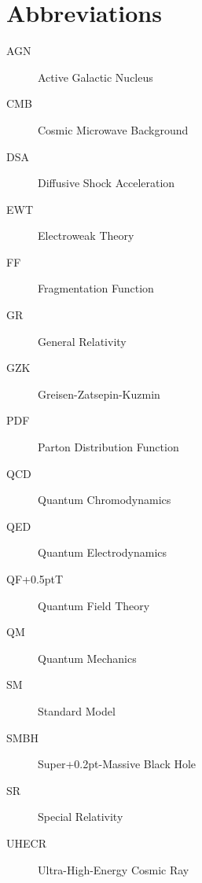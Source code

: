 \chapter*{Abbreviations}
\label{ch:abbreviations}

\begin{description}
	\item[AGN] Active Galactic Nucleus
	\item[CMB] Cosmic Microwave Background
	\item[DSA] Diffusive Shock Acceleration
	\item[EWT] Electroweak Theory
	\item[FF] Fragmentation Function
	\item[GR] General Relativity
	\item[GZK] Greisen-Zatsepin-Kuzmin
	\item[PDF] Parton Distribution Function
	\item[QCD] Quantum Chromodynamics
	\item[QED] Quantum Electrodynamics
	\item[QF{\kern+0.5pt}T] Quantum Field Theory
	\item[QM] Quantum Mechanics
	\item[SM] Standard Model
	\item[SMBH] Super{\kern+0.2pt}-Massive Black Hole
	\item[SR] Special Relativity
	\item[UHECR] Ultra-High-Energy Cosmic Ray
\end{description}
